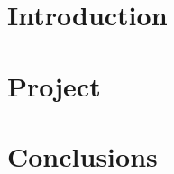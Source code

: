 \documentclass[titlepage,openright,twoside,a4paper,
final,12pt,english]{book}
\author{Álvaro González Jiménez}{Grado en Ingeniería Informática - Ingeniería del Software}{D.~}{53585603L}
\begin{document}
\makeTitlePage

\pagestyle{trinidadPhD}



\tableofcontents
\listoffigures
\listoftables


\lineNumbersOn
\part{Introduction}

\part{Project}

\part{Conclusions}


\appendix


\lineNumbersOff

\printglossaries
\newpage
\end{document}
